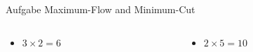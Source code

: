 \begin{frame}[allowframebreaks]{Aufgabe \thesection}{Maximum-Flow and Minimum-Cut}
\begin{solutionnoinc}
\begin{columns}
\begin{column}{0.5\textwidth}
{\begin{minipage}[t]{14cm}
            \end{minipage}
          }
      \end{column}
      \begin{column}{0.5\textwidth}
      \end{column}
    \end{columns}
  \end{solutionnoinc}
  \begin{solution}
    \begin{columns}
      \begin{column}{0.5\textwidth}
      \end{column}
      \begin{column}{0.5\textwidth}
      \end{column}
    \end{columns}
  \end{solution}
  \begin{solutionnoinc}
    \begin{columns}
      \begin{column}{0.5\textwidth}
        \begin{itemize}
          \item $3\times 2 = 6$
        \end{itemize}
      \end{column}
      \begin{column}{0.5\textwidth}
        \begin{itemize}
          \item $2\times 5 = 10$

\end{itemize}
\end{column}
\end{columns}
\end{solutionnoinc}
\end{frame}
